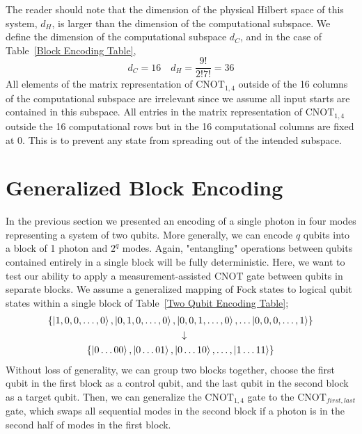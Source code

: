 \documentclass[aps,pra,twocolumn,showpacs,superscriptaddress,floatfix,10pt]{revtex4}
\begin{document}
The reader should note that the dimension of the physical Hilbert space of this system, $d_H$, is larger than the dimension of the computational subspace. We define the dimension of the computational subspace $d_C$, and in the case of Table~\ref{Block Encoding Table},
\begin{equation}
d_C = 16 \quad d_H = \frac{9!}{2! 7!} = 36
\end{equation}
All elements of the matrix representation of $\mbox{CNOT}_{1,4}$ outside of the 16 columns of the computational subspace are irrelevant since we assume all input starts are contained in this subspace. All entries in the matrix representation of $\mbox{CNOT}_{1,4}$ outside the 16 computational rows but in the 16 computational columns are fixed at 0. This is to prevent any state from spreading out of the intended subspace.
\section{Generalized Block Encoding}
In the previous section we presented an encoding of a single photon in four modes representing a system of two qubits. More generally, we can encode $q$ qubits into a block of 1 photon and $2^q$ modes. Again, "entangling" operations between qubits contained entirely in a single block will be fully deterministic. Here, we want to test our ability to apply a measurement-assisted $\mbox{CNOT}$ gate between qubits in separate blocks.  We assume a generalized mapping of Fock states to logical qubit states within a single block of Table~\ref{Two Qubit Encoding Table};
\begin{eqnarray}
\{ \ket{1,0,0,\dots,0}, \ket{0,1,0,\dots,0},\ket{0,0,1,\dots,0},\dots \ket{0,0,0,\dots,1}  \} \nonumber \\\downarrow \quad \quad \quad \quad \quad \quad \quad \quad \quad \quad \quad \quad \quad \\
\{ \ket{0\dots00},\ket{0\dots01},\ket{0\dots10},\dots,\ket{1\dots11} \} \quad \quad \quad \quad \nonumber
\end{eqnarray}
Without loss of generality, we can group two blocks together, choose the first qubit in the first block as a control qubit, and the last qubit in the second block as a target qubit. Then, we can generalize the $\mbox{CNOT}_{1,4}$ gate to the $\mbox{CNOT}_{first,last}$ gate, which swaps all sequential modes in the second block if a photon is in the second half of modes in the first block. 
\end{document}
